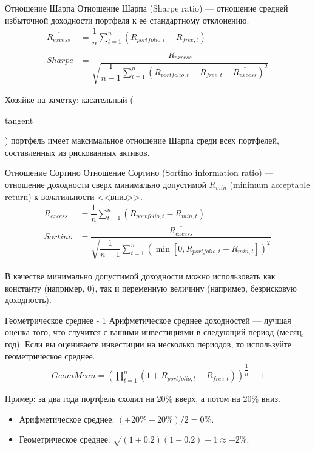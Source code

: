 \documentclass{beamer}
\newcommand{\en}[1]{\begin{otherlanguage}{english}#1\end{otherlanguage}}
\begin{document}
\begin{frame}{Отношение Шарпа}
\justify
Отношение Шарпа (Sharpe ratio) --- отношение средней избыточной доходности 
портфеля к её стандартному отклонению.
\begin{align*}
\overline{R_{excess}}
&= \dfrac{1}{n}\sum\limits_{t=1}^{n}(R_{portfolio,t} - R_{free,t})\\
Sharpe &= \dfrac{\overline{R_{excess}}}
{\sqrt{\dfrac{1}{n-1}\sum\limits_{t=1}^{n}(R_{portfolio,t} - R_{free,t} - 
\overline{R_{excess}})^2}}
\end{align*}

\justify
Хозяйке на заметку: касательный (\en{tangent}) портфель имеет максимальное 
отношение Шарпа среди всех портфелей, составленных из рискованных активов.
\end{frame}



\begin{frame}{Отношение Сортино}
\justify
Отношение Сортино (Sortino information ratio) --- отношение доходности сверх 
минимально допустимой $R_{min}$ (minimum acceptable return) к волатильности 
<<вниз>>.
\begin{align*}
\overline{R_{excess}} &=
\dfrac{1}{n}\sum\limits_{t=1}^{n}(R_{portfolio,t} - R_{min,t}) \\
Sortino &= \dfrac{
	\overline{R_{excess}}
}{
	\sqrt{\dfrac{1}{n-1}\sum\limits_{t=1}^{n}
		\left(\min[0, R_{portfolio,t} - R_{min, t}]\right)^2}
}
\end{align*}

\justify
В качестве минимально допустимой доходности можно использовать как константу 
(например, 0), так и переменную величину (например, безрисковую доходность).
\end{frame}



\begin{frame}{Геометрическое среднее - 1}
\justify
Арифметическое среднее доходностей --- лучшая оценка того, что случится с 
вашими инвестициями в следующий период (месяц, год). Если вы оцениваете 
инвестиции на несколько периодов, то используйте геометрическое среднее.
\begin{align*}
Geom Mean = \left(
\prod\limits_{t=1}^{n}(1 + R_{portfolio,t} - R_{free,t})
\right)^{\dfrac{1}{n}} - 1
\end{align*}

\justify
Пример: за два года портфель сходил на 20\% вверх, а потом на 20\% вниз.
\begin{itemize}
\justifying
\item Арифметическое среднее: $(+20\%-20\%)/2 = 0\%$.
\item Геометрическое среднее: $\sqrt{(1+0.2)(1-0.2)} - 1 \approx -2\%$. 
\end{itemize}
\end{frame}
\end{document}
